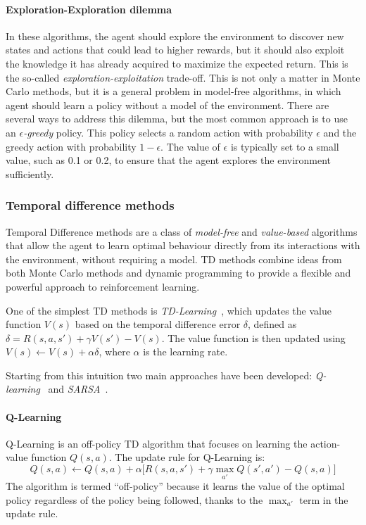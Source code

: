 \paragraph*{Exploration-Exploration dilemma}
In these algorithms, the agent should explore the environment to discover new states and actions that could lead to higher rewards,
  but it should also exploit the knowledge it has already acquired to maximize the expected return.
  This is the so-called \emph{exploration-exploitation} trade-off.
  This is not only a matter in Monte Carlo methods, but it is a general problem in model-free algorithms, in which agent should learn a policy without a model of the environment.
%
There are several ways to address this dilemma, 
 but the most common approach is to use an \emph{$\epsilon$-greedy} policy. 
 This policy selects a random action with probability \(\epsilon\) and the greedy action with probability \(1 - \epsilon\). 
 The value of \(\epsilon\) is typically set to a small value, 
 such as 0.1 or 0.2, 
 to ensure that the agent explores the environment sufficiently.
%

\subsubsection{Temporal difference methods}
Temporal Difference methods are a class of \emph{model-free} and \emph{value-based} algorithms 
 that allow the agent to learn optimal behaviour directly from its interactions with the environment, without requiring a model. 
 TD methods combine ideas from both Monte Carlo methods and dynamic programming to provide a flexible and powerful approach to reinforcement learning.

One of the simplest TD methods is \emph{TD-Learning}~\cite{DBLP:journals/ml/Sutton88}, 
 which updates the value function \(V(s)\) based on the temporal difference error \(\delta\), 
 defined as \( \delta = R(s, a, s') + \gamma V(s') - V(s) \). 
 The value function is then updated using \( V(s) \leftarrow V(s) + \alpha \delta \), where \(\alpha\) is the learning rate.

Starting from this intuition two main approaches have been developed: 
 \emph{Q-learning}~\cite{DBLP:journals/ml/WatkinsD92} and \emph{SARSA}~\cite{10.5555/3312046}. 

 \paragraph*{Q-Learning}

 Q-Learning is an off-policy TD algorithm that focuses on learning the action-value function \(Q(s, a)\). The update rule for Q-Learning is:
 \begin{equation}
 Q(s, a) \leftarrow Q(s, a) + \alpha \Big[ R(s, a, s') + \gamma \max_{a'} Q(s', a') - Q(s, a) \Big]
 \end{equation}
 The algorithm is termed ``off-policy'' because it learns the value of the optimal policy regardless of the policy being followed, 
  thanks to the \(\max_{a'}\) term in the update rule.
 
